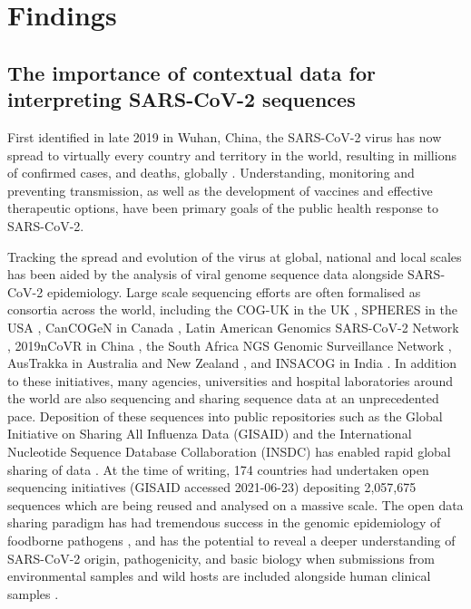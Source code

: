 \section{Findings} \label{sec:ch7_findings}

\subsection{The importance of contextual data for interpreting SARS-CoV-2 sequences}

First identified in late 2019 in Wuhan, China, the SARS-CoV-2 virus has now spread to virtually every country and territory in the world, resulting in millions of confirmed cases, and deaths, globally \cite{world_health_organization_coronavirus_nodate, dong_interactive_2020}. Understanding, monitoring and preventing transmission, as well as the development of vaccines and effective therapeutic options, have been primary goals of the public health response to SARS-CoV-2. 

Tracking the spread and evolution of the virus at global, national and local scales has been aided by the analysis of viral genome sequence data alongside SARS-CoV-2 epidemiology. Large scale sequencing efforts are often formalised as consortia across the world, including the COG-UK in the UK \cite{covid-19_genomics_uk_cog-uk_consortiumcontactcogconsortiumuk_integrated_2020}, SPHERES in the USA \cite{cdc_cases_2020}, CanCOGeN in Canada \cite{cancogen_genome_canada_cancogen_nodate}, Latin American Genomics SARS-CoV-2 Network \cite{pan_american_health_organization_laboratory_nodate, candido_evolution_2020}, 2019nCoVR in China \cite{zhao_2019_2020}, the South Africa NGS Genomic Surveillance Network \cite{network_for_genomic_surveillance_south_africa_ngs-sa_nodate}, AusTrakka in Australia and New Zealand \cite{communicable_diseases_genomics_network_austrakka_nodate}, and INSACOG in India \cite{government_of_india_indian_nodate}. In addition to these initiatives, many agencies, universities and hospital laboratories around the world are also sequencing and sharing sequence data at an unprecedented pace. Deposition of these sequences into public repositories such as the Global Initiative on Sharing All Influenza Data (GISAID) and the International Nucleotide Sequence Database Collaboration (INSDC) has enabled rapid global sharing of data \cite{shu_gisaid_2017,karsch-mizrachi_international_2018}. At the time of writing, 174 countries had undertaken open sequencing initiatives (GISAID accessed 2021-06-23) depositing 2,057,675 sequences which are being reused and analysed on a massive scale. The open data sharing paradigm has had tremendous success in the genomic epidemiology of foodborne pathogens \cite{allard_practical_2016,kubota_pulsenet_2019}, and has the potential to reveal a deeper understanding of SARS-CoV-2 origin, pathogenicity, and basic biology when submissions from environmental samples and wild hosts are included alongside human clinical samples \cite{cook_integrating_2020}.

